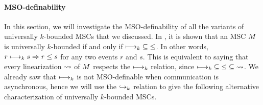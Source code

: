 


\paragraph*{MSO-definability}

In this section, we will investigate the MSO-definability of all the variants of universally $k$-bounded MSCs that we discussed.
In \cite{DBLP:conf/fossacs/LohreyM02}, it is shown that an MSC $M$ is universally $k$-bounded if and only if $\longmapsto_k \;\subseteq\; \le$. In other words, $r \longmapsto_k s \Rightarrow r \le s$ for any two events $r$ and $s$. This is equivalent to saying that every linearization $\rightsquigarrow$ of $M$ respects the $\longmapsto_k$ relation, since $\longmapsto_k \;\subseteq\; \le \;\subseteq\; \rightsquigarrow$. We already saw that $\longmapsto_k$ is not MSO-definable when communication is asynchronous, hence we will use the $\hookrightarrow_{k}$ relation to give the following alternative characterization of universally $k$-bounded MSCs.

